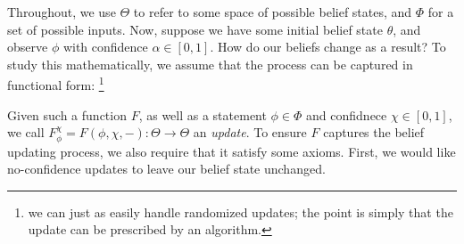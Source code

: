 
Throughout, we use $\Theta$ to refer to some space of possible belief states,
and $\Phi$ for a set of possible inputs. 
%
Now, suppose we have some initial belief state $\theta$, and observe $\phi$ with confidence $\alpha \in [0,1]$. 
How do our beliefs change as a result? 
To study this mathematically, we assume that the process can be captured in functional form:
\unskip\footnote{we can just as easily handle randomized updates;
	the point is simply that the update can be prescribed by an algorithm.}

Given such a function $F$, as well as a statement $\phi \in \Phi$
and confidnece $\chi \in [0,1]$, we call 
$F^\chi_\phi = F(\phi, \chi, -) : \Theta \to \Theta$
an \emph{update}.
To ensure $F$ captures the belief updating process, we also require that it satisfy some axioms. 
First, we would like no-confidence updates to leave our belief state unchanged. 

